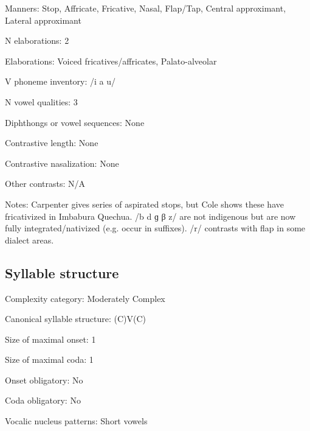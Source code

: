 {\begin{appendixdesc}
\item[Manners:] Stop, Affricate, Fricative, Nasal, Flap/Tap, Central approximant, Lateral approximant

\item[N elaborations:] 2

\item[Elaborations:] Voiced fricatives/affricates, Palato-alveolar

\item[V phoneme inventory:] /i a u/

\item[N vowel qualities:] 3

\item[Diphthongs or vowel sequences:] None

\item[Contrastive length:] None

\item[Contrastive nasalization:] None

\item[Other contrasts:] N/A

\item[Notes:] Carpenter gives series of aspirated stops, but Cole shows these have fricativized in Imbabura Quechua. /b d ɡ β z/ are not indigenous but are now fully integrated/nativized (e.g. occur in suffixes). /r/ contrasts with flap in some dialect areas.
\end{appendixdesc}
\subsection*{Syllable structure}
\begin{appendixdesc}

\item[Complexity category:] Moderately Complex

\item[Canonical syllable structure:] (C)V(C) \citep[203--205]{Cole1982}

\item[Size of maximal onset:] 1

\item[Size of maximal coda:] 1

\item[Onset obligatory:] No

\item[Coda obligatory:] No

\item[Vocalic nucleus patterns:] Short vowels


\end{appendixdesc}}
